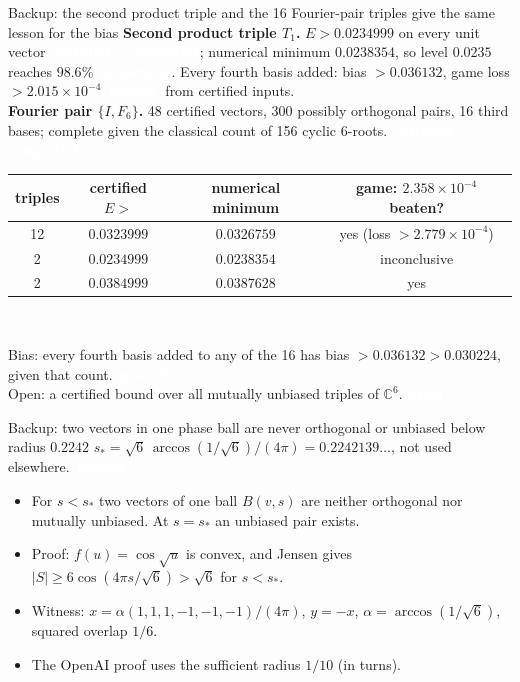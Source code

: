 \documentclass[aspectratio=169,11pt,t]{beamer}
\newcommand{\tg}[2]{{\setlength{\fboxsep}{1.2pt}\colorbox{#1}{\textcolor{white}{\sffamily\bfseries\footnotesize\,#2\,}}}}
\newcommand{\Tproved}{\tg{cProved}{proved}}
\newcommand{\Tcert}{\tg{cCert}{certified / computed}}
\newcommand{\Tnum}{\tg{cNum}{numerical}}
\newcommand{\Topen}{\tg{cOpen}{open}}
\newcommand{\C}{\mathbb{C}}
\newcommand{\abs}[1]{\lvert #1\rvert}
\begin{document}
\begin{frame}{Backup: the second product triple and the 16 Fourier-pair triples give the same lesson for the bias}
\footnotesize
\textbf{Second product triple $T_1$.} $E>0.0234999$ on every unit vector \Tcert; numerical minimum $0.0238354$, so level $0.0235$ reaches $98.6\%$ \Tnum. Every fourth basis added: bias $>0.036132$, game loss $>2.015\times10^{-4}$ \Tproved\ from certified inputs.\\[0.15cm]
\textbf{Fourier pair $\{I,F_6\}$.} 48 certified vectors, 300 possibly orthogonal pairs, 16 third bases; complete given the classical count of 156 cyclic 6-roots. \Tcert\\[0.1cm]
\centering
\renewcommand{\arraystretch}{1.2}
\begin{tabular}{@{}cccc@{}}
\toprule
triples & certified $E>$ & numerical minimum & game: $2.358\times10^{-4}$ beaten?\\
\midrule
12 & $0.0323999$ & $0.0326759$ & yes (loss $>2.779\times10^{-4}$)\\
2 & $0.0234999$ & $0.0238354$ & inconclusive\\
2 & $0.0384999$ & $0.0387628$ & yes\\
\bottomrule
\end{tabular}\\[0.15cm]
\raggedright\hspace{0.1cm}Bias: every fourth basis added to any of the 16 has bias $>0.036132>0.030224$, given that count. \Tproved\\
\hspace{0.1cm}Open: a certified bound over all mutually unbiased triples of $\C^6$. \Topen
\end{frame}

\begin{frame}{Backup: two vectors in one phase ball are never orthogonal or unbiased below radius $0.2242$}
\small
$s_\ast=\sqrt6\,\arccos(1/\sqrt6)/(4\pi)=0.2242139\ldots$, not used elsewhere. \Tproved
\begin{itemize}\setlength\itemsep{3pt}\footnotesize
\item For $s<s_\ast$ two vectors of one ball $B(v,s)$ are neither orthogonal nor mutually unbiased. At $s=s_\ast$ an unbiased pair exists.
\item Proof: $f(u)=\cos\sqrt u$ is convex, and Jensen gives $\abs{S}\ge6\cos(4\pi s/\sqrt6)>\sqrt6$ for $s<s_\ast$.
\item Witness: $x=\alpha(1,1,1,-1,-1,-1)/(4\pi)$, $y=-x$, $\alpha=\arccos(1/\sqrt6)$, squared overlap $1/6$.
\item The OpenAI proof uses the sufficient radius $1/10$ (in turns).
\end{itemize}
\end{frame}
\end{document}
